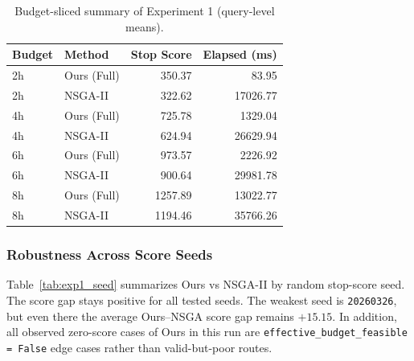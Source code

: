 \begin{table}[t]
    \centering
    \caption{Budget-sliced summary of Experiment 1 (query-level means).}
    \label{tab:exp1_budget}
    \begin{tabular}{llrr}
        \toprule
        Budget & Method      & Stop Score & Elapsed (ms) \\
        \midrule
        2h     & Ours (Full) & 350.37     & 83.95        \\
        2h     & NSGA-II     & 322.62     & 17026.77     \\
        \midrule
        4h     & Ours (Full) & 725.78     & 1329.04      \\
        4h     & NSGA-II     & 624.94     & 26629.94     \\
        \midrule
        6h     & Ours (Full) & 973.57     & 2226.92      \\
        6h     & NSGA-II     & 900.64     & 29981.78     \\
        \midrule
        8h     & Ours (Full) & 1257.89    & 13022.77     \\
        8h     & NSGA-II     & 1194.46    & 35766.26     \\
        \bottomrule
    \end{tabular}
\end{table}

\subsubsection{Robustness Across Score Seeds}
Table~\ref{tab:exp1_seed} summarizes Ours vs NSGA-II by random stop-score seed.
The score gap stays positive for all tested seeds.
The weakest seed is \texttt{20260326}, but even there the average Ours--NSGA score gap remains \(+15.15\).
In addition, all observed zero-score cases of Ours in this run are
\texttt{effective\_budget\_feasible = False} edge cases rather than valid-but-poor routes.

\begin{table}[t]
    \centering
    \caption{Score-seed robustness in Experiment 1 (task-level Ours vs NSGA-II).}
    \label{tab:exp1_seed}
\end{table}

